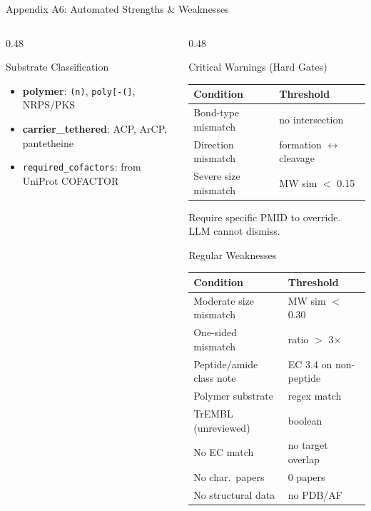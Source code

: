 \documentclass[aspectratio=169, 11pt]{beamer}
\begin{document}
\begin{frame}{Appendix A6: Automated Strengths \& Weaknesses}
\begin{columns}[T]
\begin{column}{0.48\textwidth}
\begin{block}{\small Substrate Classification}
\vspace{-2pt}
\begin{itemize}\scriptsize
\setlength\itemsep{-1pt}
\item \textbf{polymer}: \texttt{(n)}, \texttt{poly[-(]}, NRPS/PKS
\item \textbf{carrier\_tethered}: ACP, ArCP, pantetheine
\item \texttt{required\_cofactors}: from UniProt COFACTOR
\end{itemize}
\end{block}
\end{column}
\begin{column}{0.48\textwidth}
\begin{alertblock}{\small Critical Warnings (Hard Gates)}
\vspace{-2pt}
{\scriptsize
\begin{tabular}{@{}p{3.5cm} l@{}}
\toprule
\textbf{Condition} & \textbf{Threshold} \\
\midrule
Bond-type mismatch & no intersection \\
Direction mismatch & formation $\leftrightarrow$ cleavage \\
Severe size mismatch & MW sim $<$ 0.15 \\
\bottomrule
\end{tabular}
}
\vspace{2pt}
{\tiny\color{accentred} Require specific PMID to override. LLM cannot dismiss.}
\end{alertblock}

\begin{block}{\small Regular Weaknesses}
\vspace{-2pt}
{\scriptsize
\begin{tabular}{@{}p{3.5cm} l@{}}
\toprule
\textbf{Condition} & \textbf{Threshold} \\
\midrule
Moderate size mismatch & MW sim $<$ 0.30 \\
One-sided mismatch & ratio $>$ 3$\times$ \\
Peptide/amide class note & EC 3.4 on non-peptide \\
Polymer substrate & regex match \\
TrEMBL (unreviewed) & boolean \\
No EC match & no target overlap \\
No char.\ papers & 0 papers \\
No structural data & no PDB/AF \\
\bottomrule
\end{tabular}
}
\end{block}
\end{column}
\end{columns}
\end{frame}
\end{document}
